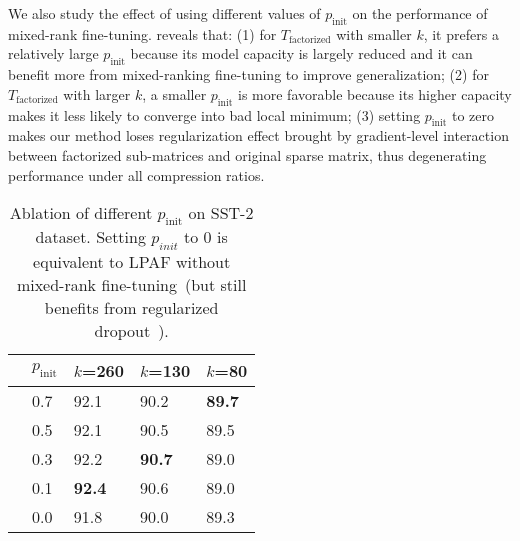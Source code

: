 We also study the effect of using different values of $p_\text{init}$ on the performance of mixed-rank fine-tuning.  reveals that: (1) for $T_\text{factorized}$ with smaller $k$, it prefers a relatively large $p_\text{init}$ because its model capacity is largely reduced and it can benefit more from mixed-ranking fine-tuning to improve generalization; (2) for $T_\text{factorized}$ with larger $k$, a smaller $p_\text{init}$ is more favorable because its higher capacity makes it less likely to converge into bad local minimum; (3) setting $p_\text{init}$ to zero makes our method loses regularization effect brought by gradient-level interaction between factorized sub-matrices and original sparse matrix, thus degenerating performance under all compression ratios.
\begin{table}[t]
	\centering
	\footnotesize
	\begin{tabular}{cl|lll}
		\toprule
		&$p_\text{init}$ & $k$=260     & $k$=130 & $k$=80   \\
		\midrule
		 & 0.7 & 92.1 & 90.2  & \textbf{89.7}  \\
		& 0.5& 92.1 & 90.5   & 89.5  \\
		& 0.3& 92.2 & \textbf{90.7}   & 89.0 \\
		& 0.1& \textbf{92.4} & 90.6   & 89.0 \\
		& 0.0  & 91.8   & 90.0   & 89.3 \\
		\bottomrule
	\end{tabular}
	\caption{Ablation of  different $p_\text{init}$ on SST-2 dataset. Setting $p_{init}$ to 0 is equivalent to LPAF without mixed-rank fine-tuning~(but still benefits from regularized dropout~\cite{rdrop}).}
	\label{table:diffp}
\end{table}


